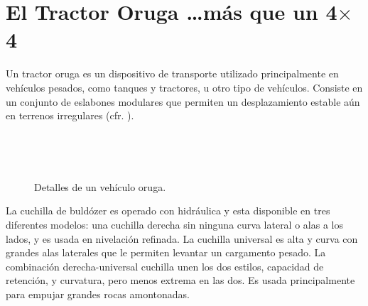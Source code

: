 \section{El Tractor Oruga \dots más que un 4$\mathbf{\times}$4}


Un tractor oruga es un dispositivo de transporte utilizado
principalmente en vehículos pesados, como tanques y tractores, u otro
tipo de vehículos. Consiste en un conjunto de eslabones modulares que
permiten un desplazamiento estable aún en terrenos irregulares
(cfr. \cite{bou}).

\begin{figure}[!hbp]
\centering
\mbox{
\qquad
{}
}

\mbox{
}
\caption{\label{fig:oruga} Detalles de un vehículo oruga.}
\end{figure}


La cuchilla de buldózer es operado con hidráulica y esta disponible en
tres diferentes modelos: una cuchilla derecha sin ninguna curva
lateral o alas a los lados, y es usada en nivelación refinada. La
cuchilla universal es alta y curva con grandes alas laterales que le
permiten levantar un cargamento pesado. La combinación
derecha-universal cuchilla unen los dos estilos, capacidad de
retención, y curvatura, pero menos extrema en las dos. Es usada
principalmente para empujar grandes rocas amontonadas.

